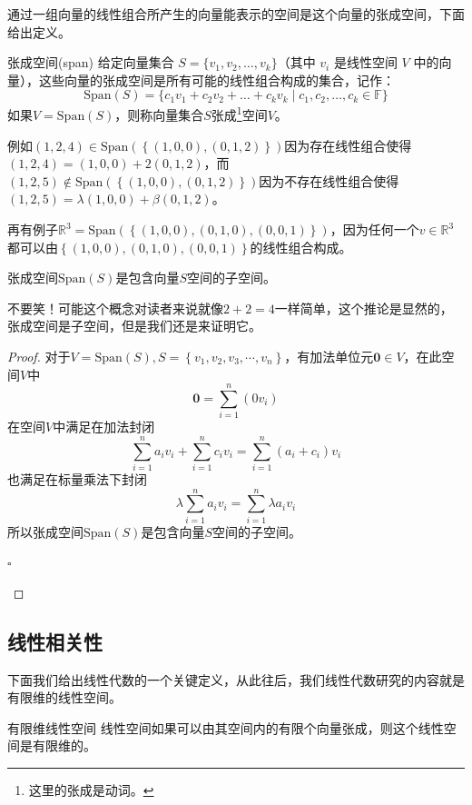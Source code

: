 通过一组向量的线性组合所产生的向量能表示的空间是这个向量的张成空间，下面给出定义。

\begin{definition}{张成空间(span)}
	给定向量集合 $ S = \{v_1, v_2, \dots, v_k\} $（其中 $ v_i $ 是线性空间 $ V $ 中的向量），这些向量的张成空间是所有可能的线性组合构成的集合，记作：$$\text{Span}(S) = \{ c_1 v_1 + c_2 v_2 + \dots + c_k v_k \mid c_1, c_2, \dots, c_k \in \mathbb{F} \}$$如果$V=\text{Span}(S)$，则称向量集合$S$张成\footnote{这里的张成是动词。}空间$V$。
\end{definition}

例如$(1,2,4) \in \text{Span}(\left\{ (1,0,0),(0,1,2) \right\})$因为存在线性组合使得$(1,2,4)=(1,0,0)+2(0,1,2)$，而$(1,2,5) \notin \text{Span}(\left\{ (1,0,0),(0,1,2) \right\})$因为不存在线性组合使得$(1,2,5)=\lambda (1,0,0)+\beta (0,1,2)$。

再有例子$\mathbb{R}^3=\text{Span}(\left\{ (1,0,0),(0,1,0),(0,0,1) \right\})$，因为任何一个$v\in \mathbb{R}^3$都可以由$\left\{ (1,0,0),(0,1,0),(0,0,1) \right\}$的线性组合构成。

\begin{corollary}
	张成空间$\text{Span}(S)$是包含向量$S$空间的子空间。
\end{corollary}

不要笑！可能这个概念对读者来说就像$2+2=4$一样简单，这个推论是显然的，张成空间是子空间，但是我们还是来证明它。

\begin{proof}
	对于$V=\text{Span}(S),S=\left\{ v_1,v_2,v_3,\cdots,v_n \right\}$，有加法单位元$\boldsymbol{0}\in V$，在此空间$V$中$$\boldsymbol{0}=\sum_{i=1}^{n}(0v_i) $$在空间$V$中满足在加法封闭$$\sum_{i=1}^{n}a_iv_i+ \sum_{i=1}^{n}c_iv_i=\sum_{i=1}^{n}(a_i+c_i)v_i$$也满足在标量乘法下封闭$$\lambda \sum_{i=1}^{n}a_iv_i= \sum_{i=1}^{n}\lambda a_iv_i$$所以张成空间$\text{Span}(S)$是包含向量$S$空间的子空间。
	\begin{flushright}
		$\square$
	\end{flushright}
\end{proof}

\subsection{线性相关性}

\label{subsec:LinearDependence}
下面我们给出线性代数的一个关键定义，从此往后，我们线性代数研究的内容就是有限维的线性空间。

\begin{definition}{有限维线性空间}
	线性空间如果可以由其空间内的有限个向量张成，则这个线性空间是有限维的。
\end{definition}

